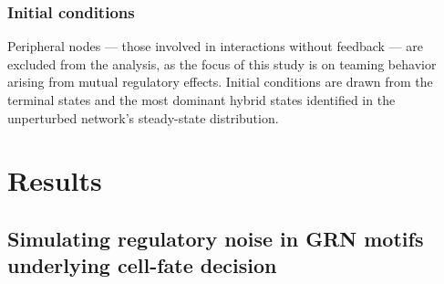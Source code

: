 \documentclass[11pt]{article}
\begin{document}
\subsubsection{Initial conditions}

Peripheral nodes — those involved in interactions without feedback — are excluded from the analysis, as the focus of this study is on teaming behavior arising from mutual regulatory effects. Initial conditions are drawn from the terminal states and the most dominant hybrid states identified in the unperturbed network's steady-state distribution.

\section{Results}

\subsection{Simulating regulatory noise in GRN motifs underlying cell-fate decision}
\end{document}
